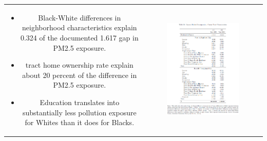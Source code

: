 \documentclass[dvipdfmx,12pt]{beamer}
\begin{document}
\begin{frame}{}
  \begin{table}
    \begin{tabular}{cc}
      \begin{minipage}{.45\textwidth}
        \begin{itemize}
          \item Black-White differences in neighborhood characteristics explain 0.324 of the documented 1.617 gap in PM2.5 exposure.
          \item tract home ownership rate explain about 20 percent of the difference in PM2.5 exposure.
          \item Education translates into substantially less pollution exposure for Whites than it does for Blacks.
        \end{itemize}
      \end{minipage} &
      \begin{minipage}{.55\textwidth}
        \begin{figure}
          \centering
          \includegraphics[scale = .4]{TB6.png}
        \end{figure}
      \end{minipage}
    \end{tabular}
  \end{table}
\end{frame}
\end{document}
